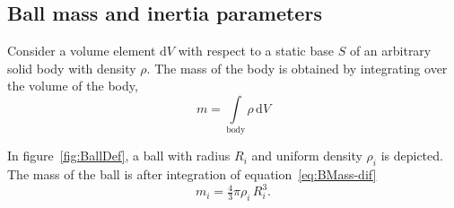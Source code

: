 \subsection{Ball mass and inertia parameters}

Consider a volume element $\mathrm{d}V$ with respect to a static base $S$ of
an arbitrary solid body with  density $\rho$. The mass of the body is
obtained by integrating over the volume of the body,
\begin{equation}
    m = \int\limits_{\mathrm{body}} \rho\, \mathrm{d}V
    \label{eq:BMass-dif}
\end{equation}

In figure~\ref{fig:BallDef}, a ball with radius $R_{i}$ and uniform density
$\rho_i$ is depicted. The mass of the ball is after integration of
equation~\eqref{eq:BMass-dif}
\begin{equation}
    m_i = \tfrac{4}{3} \pi \rho_i\, R_i^3 .
    \label{eq:BMass}
\end{equation}


\endinput
